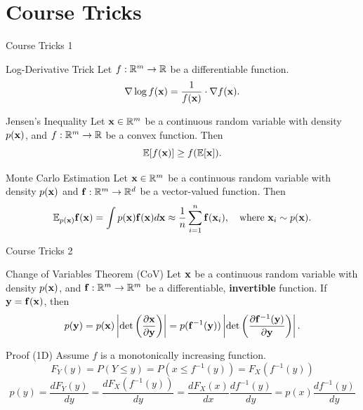\documentclass{beamer}
\begin{document}
\section{Course Tricks}
\begin{frame}{Course Tricks 1}
	\begin{block}{Log-Derivative Trick}
		Let $f: \mathbb{R}^m \rightarrow \mathbb{R}$ be a differentiable function.
		$$
			\nabla \log f(\mathbf{x}) = \frac{1}{f(\mathbf{x})} \cdot \nabla f(\mathbf{x}).
		$$
		\vspace{-0.5cm}
	\end{block}
	\begin{block}{Jensen's Inequality}
		Let $\mathbf{x} \in \mathbb{R}^m$ be a continuous random variable with density $p(\mathbf{x})$, and $f: \mathbb{R}^m \rightarrow \mathbb{R}$ be a convex function. Then
		$$
			\mathbb{E} [f(\mathbf{x})] \geq f(\mathbb{E}[\mathbf{x}]).
		$$
		\vspace{-0.7cm}
	\end{block}
	\begin{block}{Monte Carlo Estimation}
		Let $\mathbf{x} \in \mathbb{R}^m$ be a continuous random variable with density $p(\mathbf{x})$ and $\mathbf{f}: \mathbb{R}^m \rightarrow \mathbb{R}^d$ be a vector-valued function. Then 
		$$
			\mathbb{E}_{p(\mathbf{x})} \mathbf{f}(\mathbf{x}) = \int p(\mathbf{x}) \mathbf{f}(\mathbf{x}) d \mathbf{x} \approx \frac{1}{n} \sum_{i=1}^n \mathbf{f}(\mathbf{x}_i), \quad 
			\text{where } \mathbf{x}_i \sim p(\mathbf{x}).
		$$
		\vspace{-0.4cm}
	\end{block}
\end{frame}
\begin{frame}{Course Tricks 2}
	\begin{block}{Change of Variables Theorem (CoV)}
		Let $\mathbf{x}$ be a continuous random variable with density $p(\mathbf{x})$, and $\mathbf{f}: \mathbb{R}^m \rightarrow \mathbb{R}^m$ be a differentiable, \textbf{invertible} function. If $\mathbf{y} = \mathbf{f}(\mathbf{x})$, then
		$$
			p(\mathbf{y}) = p(\mathbf{x}) \left|\det \left(  \frac{\partial \mathbf{x}}{\partial \mathbf{y}} \right) \right| = p(\mathbf{f}^{-1}(\mathbf{y})) \left|\det \left(  \frac{\partial \mathbf{f}^{-1}(\mathbf{y})}{\partial \mathbf{y}} \right) \right|.
		$$
		\vspace{-0.5cm}
	\end{block}
	\begin{block}{Proof (1D)}
		Assume $f$ is a monotonically increasing function.
		$$
			F_Y(y) = P(Y \leq y) = P(x \leq f^{-1}(y)) = F_X(f^{-1}(y))
		$$
		$$
			p(y) = \frac{dF_Y(y)}{dy} = \frac{dF_X(f^{-1}(y))}{dy} = \frac{dF_X(x)}{dx} \frac{df^{-1}(y)}{dy} =  p(x) \frac{df^{-1}(y)}{dy}
		$$
	\end{block}
\end{frame}
\end{document}
